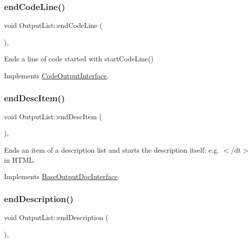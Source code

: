 \subsubsection{\texorpdfstring{endCodeLine()}{endCodeLine()}}
{\footnotesize\ttfamily void Output\+List\+::end\+Code\+Line (\begin{DoxyParamCaption}{ }\end{DoxyParamCaption})\hspace{0.3cm}{\ttfamily [inline]}, {\ttfamily [virtual]}}

Ends a line of code started with start\+Code\+Line() 

Implements \mbox{\hyperlink{class_code_output_interface_afac5763eafc78f93b82691fb9a6dcff7}{Code\+Output\+Interface}}.

\mbox{\label{class_output_list_aca7c1dd564ed727ce77f9f2bc43a74ea}} 
\subsubsection{\texorpdfstring{endDescItem()}{endDescItem()}}
{\footnotesize\ttfamily void Output\+List\+::end\+Desc\+Item (\begin{DoxyParamCaption}{ }\end{DoxyParamCaption})\hspace{0.3cm}{\ttfamily [inline]}, {\ttfamily [virtual]}}

Ends an item of a description list and starts the description itself\+: e.\+g. {\ttfamily $<$/dt$>$} in H\+T\+ML. 

Implements \mbox{\hyperlink{class_base_output_doc_interface_a09e3aa9d3faac55b2cc9290eaa69f55b}{Base\+Output\+Doc\+Interface}}.

\mbox{\label{class_output_list_a231f2150bf8b3d9823cb1f201ecc6774}} 
\subsubsection{\texorpdfstring{endDescription()}{endDescription()}}
{\footnotesize\ttfamily void Output\+List\+::end\+Description (\begin{DoxyParamCaption}{ }\end{DoxyParamCaption})\hspace{0.3cm}{\ttfamily [inline]}, {\ttfamily [virtual]}}

